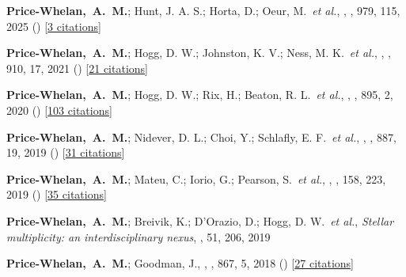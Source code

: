 \item[{\color{deemph}\scriptsize20}]\textbf{Price-Whelan,~A.~M.}; Hunt, J. A. S.; Horta, D.; Oeur, M.~\textit{et al.}, , \apj, 979, 115, 2025 () [\href{http://adsabs.harvard.edu/abs/2025ApJ...979..115P}{3 citations}]

\item[{\color{deemph}\scriptsize19}]\textbf{Price-Whelan,~A.~M.}; Hogg, D. W.; Johnston, K. V.; Ness, M. K.~\textit{et al.}, , \apj, 910, 17, 2021 () [\href{http://adsabs.harvard.edu/abs/2021ApJ...910...17P}{21 citations}]

\item[{\color{deemph}\scriptsize18}]\textbf{Price-Whelan,~A.~M.}; Hogg, D. W.; Rix, H.; Beaton, R. L.~\textit{et al.}, , \apj, 895, 2, 2020 () [\href{http://adsabs.harvard.edu/abs/2020ApJ...895....2P}{103 citations}]

\item[{\color{deemph}\scriptsize17}]\textbf{Price-Whelan,~A.~M.}; Nidever, D. L.; Choi, Y.; Schlafly, E. F.~\textit{et al.}, , \apj, 887, 19, 2019 () [\href{http://adsabs.harvard.edu/abs/2019ApJ...887...19P}{31 citations}]

\item[{\color{deemph}\scriptsize16}]\textbf{Price-Whelan,~A.~M.}; Mateu, C.; Iorio, G.; Pearson, S.~\textit{et al.}, , \aj, 158, 223, 2019 () [\href{http://adsabs.harvard.edu/abs/2019AJ....158..223P}{35 citations}]

\item[{\color{deemph}\scriptsize15}]\textbf{Price-Whelan,~A.~M.}; Breivik, K.; D'Orazio, D.; Hogg, D. W.~\textit{et al.}, \textit{Stellar multiplicity: an interdisciplinary nexus}, \baas, 51, 206, 2019

\item[{\color{deemph}\scriptsize14}]\textbf{Price-Whelan,~A.~M.}; Goodman, J., , \apj, 867, 5, 2018 () [\href{http://adsabs.harvard.edu/abs/2018ApJ...867....5P}{27 citations}]

